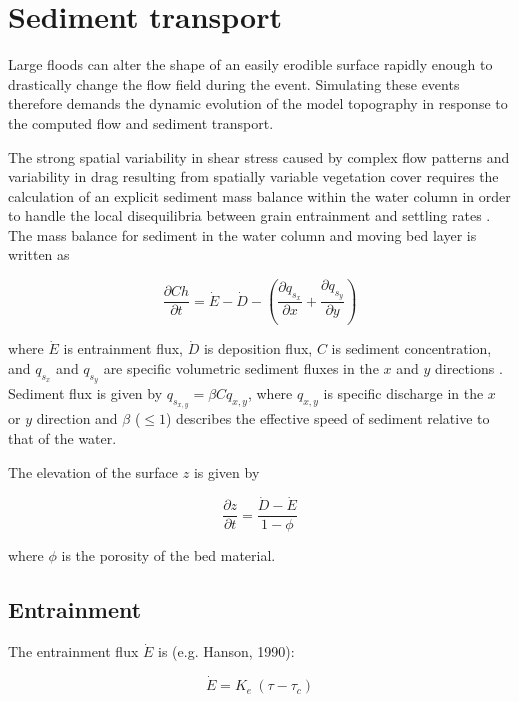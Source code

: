 \documentclass[11pt]{article}
\begin{document}
\section{Sediment transport}

Large floods can alter the shape of an easily erodible surface rapidly enough to drastically change the flow field during the event. Simulating these events therefore demands the dynamic evolution of the model topography in response to the computed flow and sediment transport.

The strong spatial variability in shear stress caused by complex flow patterns and variability in drag resulting from spatially variable vegetation cover requires the calculation of an explicit sediment mass balance within the water column in order to handle the local disequilibria between grain entrainment and settling rates \citep{davy2009fluvial}. The mass balance for sediment in the water column and moving bed layer is written as

\begin{equation}
\frac{\partial C h}{\partial t} = \dot{E} - \dot{D} - \left(\frac{\partial q_{s_x}}{\partial x} + \frac{\partial q_{s_y}}{\partial y} \right)
\end{equation}

\noindent where $\dot{E}$ is entrainment flux, $\dot{D}$ is deposition flux, $C$ is sediment concentration, and $q_{s_x}$ and $q_{s_y}$ are specific volumetric sediment fluxes in the $x$ and $y$ directions \citep[e.g.,][]{davy2009fluvial}. Sediment flux is given by $q_{s_{x,y}} = \beta C q_{x,y}$, where $q_{x,y}$ is specific discharge in the $x$ or $y$ direction and $\beta$ ($\le 1$) describes the effective speed of sediment relative to that of the water.

The elevation of the surface $z$ is given by

\begin{equation}
\frac{\partial z}{\partial t} = \frac{\dot{D} - \dot{E}}{1 - \phi}
\end{equation}

\noindent where $\phi$ is the porosity of the bed material.

\subsection{Entrainment}

The entrainment flux $\dot{E}$ is (e.g. Hanson, 1990):

\begin{equation}
\dot{E} = K_e \: (\tau - {\tau_c})
\end{equation}
\end{document}
